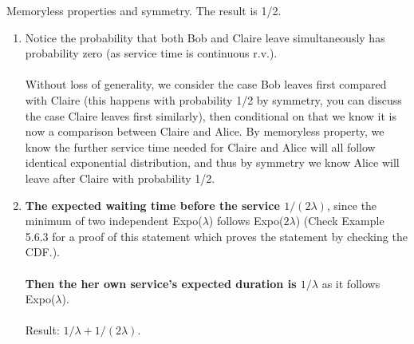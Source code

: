 

\setcounter{theorem}{35}
\begin{exercise}[BH.5.36]
\begin{hint}
    Memoryless properties and symmetry. The result is 1/2.
\end{hint}
\begin{solution}
    \begin{enumerate}
	    \item Notice the probability that both Bob and Claire leave simultaneously has probability zero (as service time is continuous r.v.). 
    	\\~\\
    	Without loss of generality, we consider the case Bob leaves first compared with Claire (this happens with probability 1/2 by symmetry, you can discuss the case Claire leaves first similarly), then conditional on that we know it is now a comparison between Claire and Alice. By memoryless property, we know the further service time needed for Claire and Alice will all follow identical exponential distribution, and thus by symmetry we know Alice will leave after Claire with probability 1/2.    
        \item \textbf{The expected  waiting time before the service $1/(2\lambda)$}, since the minimum of two independent Expo($\lambda$) follows Expo($2\lambda$) (Check Example 5.6.3 for a proof of this statement which proves the statement by checking the CDF.). \\~\\
    	\textbf{Then the her own service's expected duration is $1/\lambda$ }as it follows Expo($\lambda$). \\~\\
    	Result: $1/\lambda+1/(2\lambda)$.
	\end{enumerate}
\end{solution}
\end{exercise}


